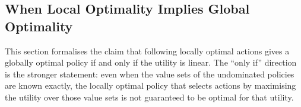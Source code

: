 




\subsection{When Local Optimality Implies Global Optimality}
\label{sec:5-6-3-fundamental_assumption_of_momcts}

    This section formalises the claim that following locally optimal actions gives a globally optimal policy if and only if the utility is linear. The ``only if'' direction is the stronger statement: even when the value sets of the undominated policies are known exactly, the locally optimal policy that selects actions by maximising the utility over those value sets is not guaranteed to be optimal for that utility.



